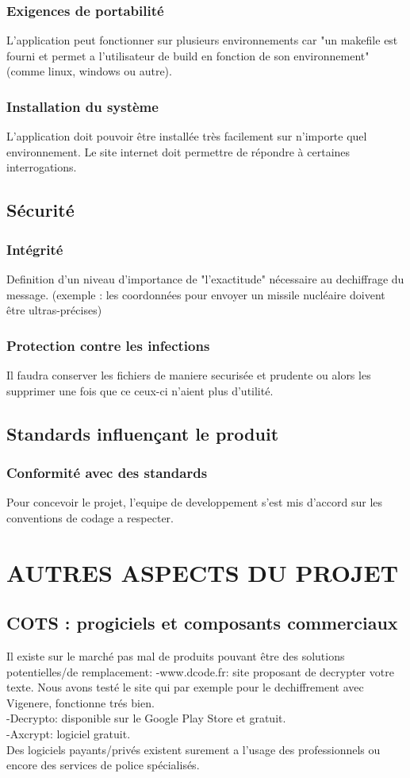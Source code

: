 \documentclass[a4]{article}
\begin{document}
			\subsubsection {Exigences de portabilité}
				L'application peut fonctionner sur plusieurs environnements car "un makefile est fourni et 				permet a l'utilisateur de build en fonction de son environnement"(comme linux, windows ou autre).
			\subsubsection {Installation du système}
				L'application doit pouvoir être installée très facilement sur n'importe quel environnement.
				Le site internet doit permettre de répondre à certaines interrogations.
		\subsection{Sécurité}
			\subsubsection {Intégrité}
				Definition d'un niveau d'importance de "l'exactitude" nécessaire au dechiffrage du message.
				(exemple : les coordonnées pour envoyer un missile nucléaire doivent être ultras-précises)
			\subsubsection {Protection contre les infections}
				Il faudra conserver les fichiers de maniere securisée et prudente ou alors les supprimer une 					fois que ce ceux-ci n'aient plus d'utilité.
		\subsection{Standards influençant le produit}
			\subsubsection {Conformité avec des standards}
			Pour concevoir le projet, l'equipe de developpement s'est mis d'accord sur les conventions de codage a respecter.
\section{AUTRES ASPECTS DU PROJET}
		\subsection{COTS : progiciels et composants commerciaux}
		Il existe sur le marché pas mal de produits pouvant être des solutions potentielles/de remplacement:
		-www.dcode.fr: site proposant de decrypter votre texte. Nous avons testé le site qui par exemple
		pour le dechiffrement avec Vigenere, fonctionne trés bien.\\
		-Decrypto: disponible sur le Google Play Store et gratuit.\\
		-Axcrypt: logiciel gratuit.\\
		 Des logiciels payants/privés existent surement a l'usage des professionnels ou encore des services de police spécialisés.
\end{document}
